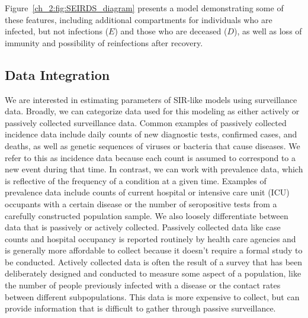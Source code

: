 Figure~\ref{ch_2:fig:SEIRDS_diagram} presents a model demonstrating some of these features, including additional compartments for individuals who are infected, but not infections (\( E \)) and those who are deceased (\( D \)), as well as loss of immunity and possibility of reinfections after recovery.

\subsection{Data Integration}
\label{ch_2:sec:data_integration}
We are interested in estimating parameters of SIR-like models using surveillance data.
Broadly, we can categorize data used for this modeling as either actively or passively collected surveillance data.
Common examples of passively collected incidence data include daily counts of new diagnostic tests, confirmed cases, and deaths, as well as genetic sequences of viruses or bacteria that cause diseases.
We refer to this as incidence data because each count is assumed to correspond to a new event during that time.
In contrast, we can work with prevalence data, which is reflective of the frequency of a condition at a given time.
Examples of prevalence data include counts of current hospital or intensive care unit (ICU) occupants with a certain disease or the number of seropositive tests from a carefully constructed population sample.
We also loosely differentiate between data that is passively or actively collected.
Passively collected data like case counts and hospital occupancy is reported routinely by health care agencies and is generally more affordable to collect because it doesn't require a formal study to be conducted.
Actively collected data is often the result of a survey that has been deliberately designed and conducted to measure some aspect of a population, like the number of people previously infected with a disease or the contact rates between different subpopulations.
This data is more expensive to collect, but can provide information that is difficult to gather through passive surveillance.

